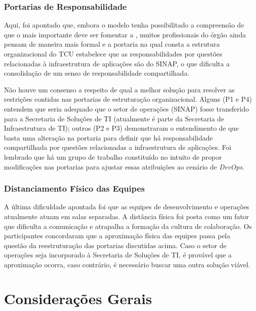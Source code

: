 \subsubsection{Portarias de Responsabilidade}

Aqui, foi apontado que, embora o modelo tenha possibilitado a compreensão de que
o mais importante deve ser fomentar a , muitos
profissionais do órgão ainda pensam de maneira mais formal e a portaria na qual
consta a estrutura organizacional do \acrshort{TCU}
estabelece que as responsabilidades por questões relacionadas à infraestrutura
de aplicações são do \acrshort{SINAP}, o que dificulta a consolidação de um senso
de responsabilidade compartilhada.

Não houve um consenso a respeito de qual a melhor solução para resolver as
restrições contidas nas portarias de estruturação organizacional. Alguns (P1 e P4)
entendem que seria adequado que o setor de operações (\acrshort{SINAP}) fosse
transferido para a Secretaria de Soluções de \acrshort{TI} (atualmente é
parte da Secretaria de Infraestrutura de \acrshort{TI}); outros (P2 e P3)
demonstraram o entendimento de que basta uma alteração na portaria para definir
que há responsabilidade compartilhada por questões relacionadas a infraestrutura
de aplicações. Foi lembrado que há um grupo de trabalho constituído no intuito
de propor modificações nas portarias para ajustar essas atribuições ao
cenário de {\it DevOps}.

\subsubsection{Distanciamento Físico das Equipes}

A última dificuldade apontada foi que as equipes de desenvolvimento e operações
atualmente atuam em salas separadas. A distância física foi posta como um fator
que dificulta a comunicação e atrapalha a formação da cultura de colaboração.
Os participantes concordaram que a aproximação física das equipes passa pela
questão da reestruturação das portarias discutidas acima. Caso o setor de
operações seja incorporado à Secretaria de Soluções de \acrshort{TI}, é provável
que a aproximação ocorra, caso contrário, é necessário buscar uma outra solução
viável.

\section{Considerações Gerais}

